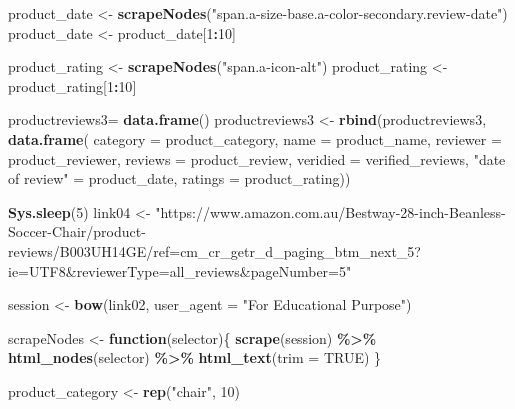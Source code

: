 \documentclass[
]{article}
\newenvironment{Shaded}{\begin{snugshade}}{\end{snugshade}}
\newcommand{\AttributeTok}[1]{\textcolor[rgb]{0.13,0.29,0.53}{#1}}
\newcommand{\ConstantTok}[1]{\textcolor[rgb]{0.56,0.35,0.01}{#1}}
\newcommand{\ControlFlowTok}[1]{\textcolor[rgb]{0.13,0.29,0.53}{\textbf{#1}}}
\newcommand{\DecValTok}[1]{\textcolor[rgb]{0.00,0.00,0.81}{#1}}
\newcommand{\FunctionTok}[1]{\textcolor[rgb]{0.13,0.29,0.53}{\textbf{#1}}}
\newcommand{\NormalTok}[1]{#1}
\newcommand{\OtherTok}[1]{\textcolor[rgb]{0.56,0.35,0.01}{#1}}
\newcommand{\SpecialCharTok}[1]{\textcolor[rgb]{0.81,0.36,0.00}{\textbf{#1}}}
\newcommand{\StringTok}[1]{\textcolor[rgb]{0.31,0.60,0.02}{#1}}
\begin{document}
\begin{Shaded}
\begin{Highlighting}[]
\NormalTok{  product\_date }\OtherTok{\textless{}{-}} \FunctionTok{scrapeNodes}\NormalTok{(}\StringTok{"span.a{-}size{-}base.a{-}color{-}secondary.review{-}date"}\NormalTok{)}
\NormalTok{  product\_date }\OtherTok{\textless{}{-}}\NormalTok{ product\_date[}\DecValTok{1}\SpecialCharTok{:}\DecValTok{10}\NormalTok{]}
  
\NormalTok{  product\_rating }\OtherTok{\textless{}{-}} \FunctionTok{scrapeNodes}\NormalTok{(}\StringTok{"span.a{-}icon{-}alt"}\NormalTok{)}
\NormalTok{  product\_rating }\OtherTok{\textless{}{-}}\NormalTok{ product\_rating[}\DecValTok{1}\SpecialCharTok{:}\DecValTok{10}\NormalTok{]}
  
\NormalTok{  productreviews3}\OtherTok{=} \FunctionTok{data.frame}\NormalTok{()}
\NormalTok{  productreviews3 }\OtherTok{\textless{}{-}} \FunctionTok{rbind}\NormalTok{(productreviews3, }\FunctionTok{data.frame}\NormalTok{(}
                      \AttributeTok{category =}\NormalTok{ product\_category,}
                      \AttributeTok{name =}\NormalTok{ product\_name,}
                      \AttributeTok{reviewer =}\NormalTok{ product\_reviewer,}
                      \AttributeTok{reviews =}\NormalTok{ product\_review,}
                      \AttributeTok{veridied =}\NormalTok{ verified\_reviews,}
                      \StringTok{"date of review"} \OtherTok{=}\NormalTok{ product\_date,}
                      \AttributeTok{ratings =}\NormalTok{ product\_rating))}
  
   \FunctionTok{Sys.sleep}\NormalTok{(}\DecValTok{5}\NormalTok{)}
\NormalTok{link04 }\OtherTok{\textless{}{-}} \StringTok{"https://www.amazon.com.au/Bestway{-}28{-}inch{-}Beanless{-}Soccer{-}Chair/product{-}reviews/B003UH14GE/ref=cm\_cr\_getr\_d\_paging\_btm\_next\_5?ie=UTF8\&reviewerType=all\_reviews\&pageNumber=5"}


\NormalTok{  session }\OtherTok{\textless{}{-}} \FunctionTok{bow}\NormalTok{(link02,}
               \AttributeTok{user\_agent =} \StringTok{"For Educational Purpose"}\NormalTok{)}

\NormalTok{  scrapeNodes }\OtherTok{\textless{}{-}} \ControlFlowTok{function}\NormalTok{(selector)\{}
    \FunctionTok{scrape}\NormalTok{(session) }\SpecialCharTok{\%\textgreater{}\%}
      \FunctionTok{html\_nodes}\NormalTok{(selector) }\SpecialCharTok{\%\textgreater{}\%}
      \FunctionTok{html\_text}\NormalTok{(}\AttributeTok{trim =} \ConstantTok{TRUE}\NormalTok{)}
\NormalTok{  \}}

\NormalTok{  product\_category }\OtherTok{\textless{}{-}} \FunctionTok{rep}\NormalTok{(}\StringTok{"chair"}\NormalTok{, }\DecValTok{10}\NormalTok{)}


\end{Highlighting}
\end{Shaded}
\end{document}
